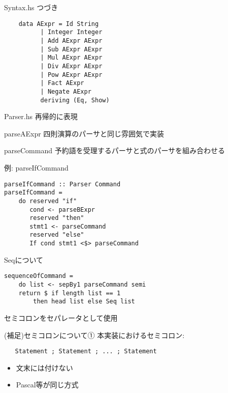 \documentclass[uplatex,dvipdfmx,ja=standard]{beamer}
\begin{document}
\begin{frame}[fragile]{Syntax.hs}
    つづき
    \begin{verbatim}
    data AExpr = Id String 
          | Integer Integer
          | Add AExpr AExpr
          | Sub AExpr AExpr
          | Mul AExpr AExpr
          | Div AExpr AExpr
          | Pow AExpr AExpr
          | Fact AExpr
          | Negate AExpr
          deriving (Eq, Show)
    \end{verbatim}
\end{frame}

\begin{frame}[fragile]{Parser.hs}
    再帰的に表現
\end{frame}

\begin{frame}[fragile]{parseAExpr}
    四則演算のパーサと同じ雰囲気で実装
\end{frame}

\begin{frame}[fragile]{parseCommand}
    予約語を受理するパーサと式のパーサを組み合わせる

    例: parseIfCommand
    \begin{verbatim}
parseIfCommand :: Parser Command
parseIfCommand =
    do reserved "if"
       cond <- parseBExpr 
       reserved "then"
       stmt1 <- parseCommand
       reserved "else"
       If cond stmt1 <$> parseCommand
   \end{verbatim}
\end{frame}

\begin{frame}[fragile]{Seqについて}
    \begin{verbatim}
sequenceOfCommand =
    do list <- sepBy1 parseCommand semi
    return $ if length list == 1 
        then head list else Seq list
   \end{verbatim}

セミコロンをセパレータとして使用

\end{frame}

\begin{frame}[fragile]{(補足)セミコロンについて①}
    本実装におけるセミコロン:
   \begin{verbatim}
   Statement ; Statement ; ... ; Statement
   \end{verbatim}
   \begin{itemize}
       \item 文末には付けない
       \item Pascal等が同じ方式
   \end{itemize}
\end{frame}
\end{document}
